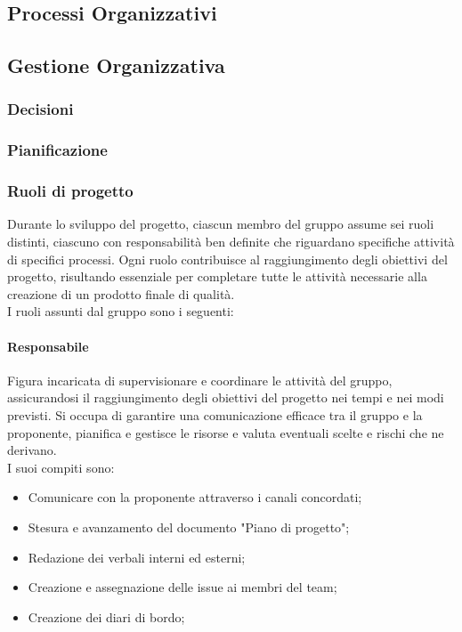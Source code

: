 \documentclass[10pt]{article}
\begin{document}
\begin{justify}
\newpage
\section{Processi Organizzativi}
    \subsection{Gestione Organizzativa}

    \subsubsection{Decisioni}

    \subsubsection{Pianificazione}

    \subsubsection{Ruoli di progetto}
    Durante lo sviluppo del progetto, ciascun membro del gruppo assume sei ruoli distinti, ciascuno con responsabilità ben definite che riguardano specifiche attività di specifici processi.
    Ogni ruolo contribuisce al raggiungimento degli obiettivi del progetto, risultando essenziale per completare tutte le attività necessarie alla creazione di un prodotto finale di qualità.\\
    I ruoli assunti dal gruppo sono i seguenti:
    
        \paragraph{Responsabile}
        Figura incaricata di supervisionare e coordinare le attività del gruppo, assicurandosi il raggiungimento degli obiettivi del progetto nei tempi e nei modi previsti. Si occupa di garantire una comunicazione efficace tra il gruppo e la proponente, pianifica e gestisce le risorse e valuta eventuali scelte e rischi che ne derivano.\\
        I suoi compiti sono:
        \begin{itemize}
            \item Comunicare con la proponente attraverso i canali concordati;
            \item Stesura e avanzamento del documento "Piano di progetto";
            \item Redazione dei verbali interni ed esterni;
            \item Creazione e assegnazione delle issue ai membri del team;
            \item Creazione dei diari di bordo;
        \end{itemize}


\end{justify}
\end{document}

